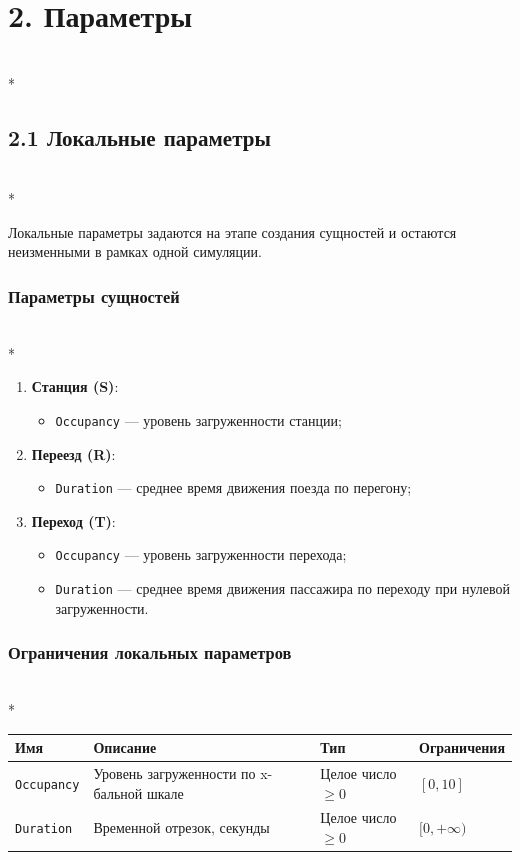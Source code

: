 \documentclass[12pt]{article}
\begin{document}
\section*{2. Параметры}\mbox{}\\*

\subsection*{2.1 Локальные параметры}\mbox{}\\*

Локальные параметры задаются на этапе создания сущностей и остаются неизменными в рамках одной симуляции.

\subsubsection*{Параметры сущностей}\mbox{}\\*

\begin{enumerate}
\item \textbf{Станция (S)}:
  \begin{itemize}
    \item \texttt{Occupancy} — уровень загруженности станции;
  \end{itemize}
\item \textbf{Переезд (R)}:
  \begin{itemize}
    \item \texttt{Duration} — среднее время движения поезда по перегону;
  \end{itemize}
\item \textbf{Переход (T)}:
  \begin{itemize}  
    \item \texttt{Occupancy} — уровень загруженности перехода;
    \item \texttt{Duration} — среднее время движения пассажира по переходу при нулевой загруженности.
  \end{itemize}
\end{enumerate}

\subsubsection*{Ограничения локальных параметров}\mbox{}\\*

\begin{tabular}{|l|>{\raggedright\arraybackslash}m{7cm}|l|l|}
\hline
Имя & Описание & Тип & Ограничения \\
\hline
\texttt{Occupancy} & Уровень загруженности по x-бальной шкале & Целое число $\geq 0$ & $[0, 10]$ \\
\hline
\texttt{Duration} & Временной отрезок, секунды & Целое число $\geq 0$ & $[0, +\infty)$ \\
\hline
\end{tabular}
\end{document}
